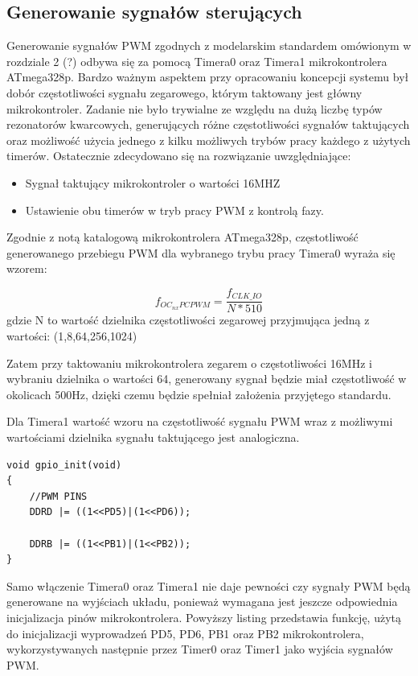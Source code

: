 \subsection{Generowanie sygnałów sterujących}

Generowanie sygnałów PWM zgodnych z modelarskim standardem omówionym w rozdziale 2 (?) odbywa się za pomocą Timera0 oraz Timera1 mikrokontrolera ATmega328p. Bardzo ważnym aspektem przy opracowaniu koncepcji systemu był dobór częstotliwości sygnału zegarowego, którym taktowany jest główny mikrokontroler. Zadanie nie było trywialne ze względu na dużą liczbę typów rezonatorów kwarcowych, generujących różne częstotliwości sygnałów taktujących oraz możliwość użycia jednego z kilku możliwych trybów pracy każdego z użytych timerów. Ostatecznie zdecydowano się na rozwiązanie uwzględniające:
\begin{itemize}
	\item Sygnał taktujący mikrokontroler o wartości 16MHZ
	\item Ustawienie obu timerów w tryb pracy PWM z kontrolą fazy.
\end{itemize}

Zgodnie z notą katalogową mikrokontrolera ATmega328p, częstotliwość generowanego przebiegu PWM dla wybranego trybu pracy Timera0 wyraża się wzorem:

\begin{equation}
	f_{OC_{nx}PCPWM} = \frac{f_{CLK\_IO}}{N * 510}
\end{equation}
gdzie N to wartość dzielnika częstotliwości zegarowej przyjmująca jedną z wartości: (1,8,64,256,1024)
 
Zatem przy taktowaniu mikrokontrolera zegarem o częstotliwości 16MHz i wybraniu dzielnika o wartości 64, generowany sygnał będzie miał częstotliwość w okolicach 500Hz, dzięki czemu będzie spełniał założenia przyjętego standardu. 

Dla Timera1 wartość wzoru na częstotliwość sygnału PWM wraz z możliwymi wartościami dzielnika sygnału taktującego jest analogiczna.

\begin{lstlisting}
void gpio_init(void)
{
	//PWM PINS
	DDRD |= ((1<<PD5)|(1<<PD6));

	DDRB |= ((1<<PB1)|(1<<PB2));
}
\end{lstlisting}

Samo włączenie Timera0 oraz Timera1 nie daje pewności czy sygnały PWM będą generowane na wyjściach układu, ponieważ wymagana jest jeszcze odpowiednia inicjalizacja pinów mikrokontrolera. Powyższy listing przedstawia funkcję, użytą do inicjalizacji wyprowadzeń PD5, PD6, PB1 oraz PB2 mikrokontrolera, wykorzystywanych następnie przez Timer0 oraz Timer1 jako wyjścia sygnałów PWM. 

